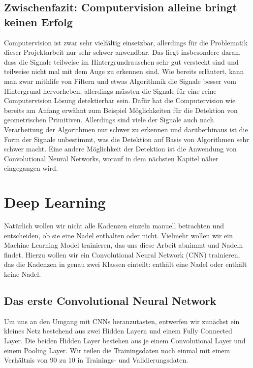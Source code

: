 \documentclass[12pt, a4paper]{article}
\begin{document}
\subsection{Zwischenfazit: Computervision alleine bringt keinen Erfolg}
Computervision ist zwar sehr vielfältig einsetzbar, allerdings für die Problematik dieser Projektarbeit nur sehr schwer anwendbar. Das liegt insbesondere daran, dass die Signale teilweise im Hintergrundrauschen sehr gut versteckt sind und teilweise nicht mal mit dem Auge zu erkennen sind. Wie bereits erläutert, kann man zwar mithlife von Filtern und etwas Algorithmik die Signale besser vom Hintergrund hervorheben, allerdings müssten die Signale für eine reine Computervision Lösung detektierbar sein. Dafür hat die Computervision wie bereits am Anfang erwähnt zum Beispiel Möglichkeiten für die Detektion von geometrischen Primitiven. Allerdings sind viele der Signale auch nach Verarbeitung der Algorithmen nur schwer zu erkennen und darüberhinaus ist die Form der Signale unbestimmt, was die Detektion auf Basis von Algorithmen sehr schwer macht. Eine andere Möglichkeit der Detektion ist die Anwendung von Convolutional Neural Networks, worauf in dem nächsten Kapitel näher eingegangen wird.

\section{Deep Learning}
Natürlich wollen wir nicht alle Kadenzen einzeln manuell betrachten und entscheiden, ob sie eine Nadel enthalten oder nicht. Vielmehr wollen wir ein Machine Learning Model trainieren, das uns diese Arbeit abnimmt und Nadeln findet. Hierzu wollen wir ein Convolutional Neural Network (CNN) trainieren, das die Kadenzen in genau zwei Klassen einteilt: enthält eine Nadel oder enthält keine Nadel.

\subsection{Das erste Convolutional Neural Network}
Um uns an den Umgang mit CNNs heranzutasten, entwerfen wir zunächst ein kleines Netz bestehend aus zwei Hidden Layern und einem Fully Connected Layer. Die beiden Hidden Layer bestehen aus je einem Convolutional Layer und einem Pooling Layer. Wir teilen die Trainingsdaten noch einmal mit einem Verhältnis von 90 zu 10 in Trainings- und Validierungsdaten. 
\end{document}
